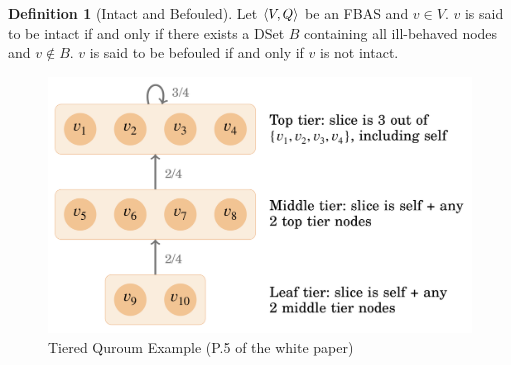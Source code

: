 \documentclass[12pt, psamsfonts]{amsart}
\theoremstyle{definition}
\newtheorem{defn}[thm]{Definition}
\theoremstyle{remark}
\numberwithin{equation}{subsection}
\begin{document}
\begin{defn}[Intact and Befouled]\label{def_intact_befouled}
    Let $\ev{V, Q}$ be an FBAS and $v \in V$.
    $v$ is said to be intact if and only if there exists a DSet $B$ containing all ill-behaved nodes and $v \notin B$.
    $v$ is said to be befouled if and only if $v$ is not intact.
\end{defn}

\begin{figure}[!htb]
    \includegraphics[width=.5\linewidth]{img/tiered_quorum_example.jpeg}
        \caption{Tiered Quroum Example (P.5 of the white paper)}
    \label{fig:tiered_quorum_example}
\end{figure}
\end{document}
